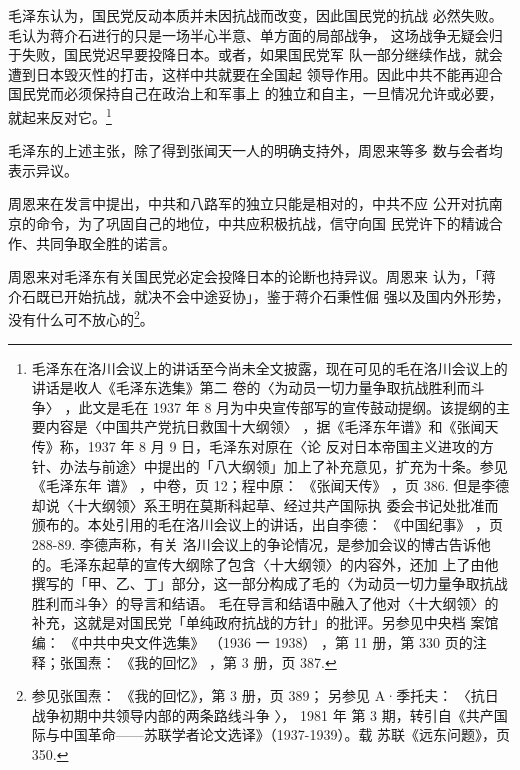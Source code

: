 毛泽东认为，国民党反动本质并未因抗战而改变，因此国民党的抗战
必然失败。毛认为蒋介石进行的只是一场半心半意、单方面的局部战争，
这场战争无疑会归于失败，国民党迟早要投降日本。或者，如果国民党军
队一部分继续作战，就会遭到日本毁灭性的打击，这样中共就要在全国起
领导作用。因此中共不能再迎合国民党而必须保持自己在政治上和军事上
的独立和自主，一旦情况允许或必要，就起来反对它。\footnote{毛泽东在洛川会议上的讲话至今尚未全文披露，现在可见的毛在洛川会议上的讲话是收人《毛泽东选集》第二
卷的〈为动员一切力量争取抗战胜利而斗争〉
，此文是毛在 1937 年 8 月为中央宣传部写的宣传鼓动提纲。该提纲的主
要内容是〈中国共产党抗日救国十大纲领〉
，据《毛泽东年谱》和《张闻天传》称，1937 年 8 月 9 日，毛泽东对原在〈论
反对日本帝国主义进攻的方针、办法与前途〉中提出的「八大纲领」加上了补充意见，扩充为十条。参见《毛泽东年
谱》
，中卷，页 12；程中原：
《张闻天传》
，页 386. 但是李德却说〈十大纲领〉系王明在莫斯科起草、经过共产国际执
委会书记处批准而颁布的。本处引用的毛在洛川会议上的讲话，出自李德：
《中国纪事》
，页 288-89. 李德声称，有关
洛川会议上的争论情况，是参加会议的博古告诉他的。毛泽东起草的宣传大纲除了包含〈十大纲领〉的内容外，还加
上了由他撰写的「甲、乙、丁」部分，这一部分构成了毛的〈为动员一切力量争取抗战胜利而斗争〉的导言和结语。
毛在导言和结语中融入了他对〈十大纲领〉的补充，这就是对国民党「单纯政府抗战的方针」的批评。另参见中央档
案馆编：
《中共中央文件选集》
（1936 一 1938）
，第 11 册，第 330 页的注释；张国焘：
《我的回忆》
，第 3 册，页 387. 
} 

毛泽东的上述主张，除了得到张闻天一人的明确支持外，周恩来等多
数与会者均表示异议。

周恩来在发言中提出，中共和八路军的独立只能是相对的，中共不应
公开对抗南京的命令，为了巩固自己的地位，中共应积极抗战，信守向国
民党许下的精诚合作、共同争取全胜的诺言。

周恩来对毛泽东有关国民党必定会投降日本的论断也持异议。周恩来 认为，「蒋
介石既已开始抗战，就决不会中途妥协」，鉴于蒋介石秉性倔 强以及国内外形势，
没有什么可不放心的\footnote{参见张国焘： 《我的回忆》，第 3 册，页 389；
另参见 A·季托夫： 〈抗日战争初期中共领导内部的两条路线斗争 〉， 1981 年
第 3 期，转引自《共产国际与中国革命——苏联学者论文选译》（1937-1939）。载
苏联《远东问题》，页 350.}。

